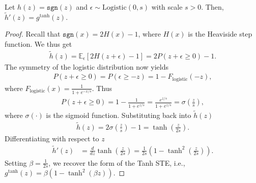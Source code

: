 \documentclass[10pt,a4paper]{amsart}
\providecommand{\E}{{\mathbb E}}
\begin{document}
\begin{lemma}
Let $h(z) = \texttt{sgn}(z)$ and  $\epsilon \sim \text{Logistic}(0, s)$ with scale $s > 0$. Then, $\tilde{h}'(z)=g^\text{tanh}(z)$.
\end{lemma}

\begin{proof}
    Recall that $\texttt{sgn}(x) = 2H(x) - 1$, where $H(x)$ is the Heaviside step function. 
    We thus get
    \begin{align}
        \tilde{h}(z) = \E_\epsilon [2H(z+\epsilon) - 1] = 2 P(z + \epsilon \ge 0) - 1.
    \end{align}
    The symmetry of the logistic distribution now yields
    \begin{align}
        P(z + \epsilon \ge 0) = P(\epsilon \ge -z) = 1 - F_{\text{logistic}}(-z),
    \end{align}
    where $F_{\text{logistic}}(x) = \frac{1}{1 + e^{-x/s}}$. Thus
    \begin{align}
        P(z + \epsilon \ge 0) = 1 - \frac{1}{1 + e^{z/s}} = \frac{e^{z/s}}{1 + e^{z/s}} = \sigma\left(\frac{z}{s}\right),
    \end{align}
    where $\sigma(\cdot)$ is the sigmoid function. Substituting back into $\tilde{h}(z)$
    \begin{align}
        \tilde{h}(z) = 2 \sigma\left(\frac{z}{s}\right) - 1 = \tanh\left(\frac{z}{2s}\right).
    \end{align}
    Differentiating with respect to $z$
    \begin{align}
        \tilde{h}'(z) &= \frac{d}{dz} \tanh\left(\frac{z}{2s}\right) = \frac{1}{2s} \left( 1 - \tanh^2\left(\frac{z}{2s}\right) \right).
    \end{align}
    Setting $\beta = \frac{1}{2s}$, we recover the form of the Tanh STE, i.e., $g^\text{tanh}(z) = \beta(1 - \tanh^2(\beta z))$.
\end{proof}
\end{document}
